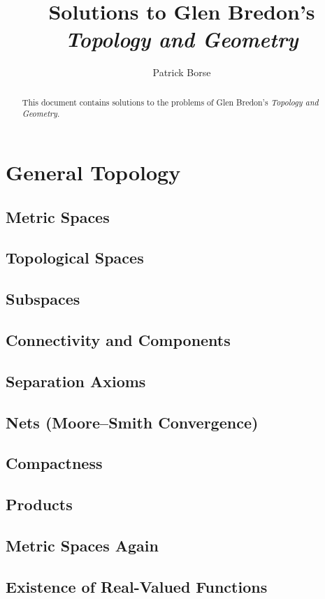 \documentclass[oneside]{amsbook}
\title{Solutions to Glen Bredon's\\ \emph{Topology and Geometry}}
\author{Patrick Borse}
\numberwithin{prob}{section}
\begin{document}
\begin{abstract}
This document contains solutions to the problems of Glen Bredon's \emph{Topology and Geometry}.
\end{abstract}

\maketitle

\tableofcontents

\chapter{General Topology}
\section{Metric Spaces}

\section{Topological Spaces}

\section{Subspaces}

\section{Connectivity and Components}

\section{Separation Axioms}

\section{Nets (Moore--Smith Convergence)}

\section{Compactness}

\section{Products}

\section{Metric Spaces Again}

\section{Existence of Real-Valued Functions}

\end{document}
